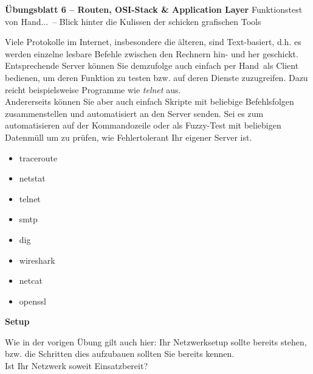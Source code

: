 \documentclass[paper=a4,fontsize=11pt]{scrartcl}%
\numberwithin{equation}{section}
\begin{document}
\begin{center}
\Large{\textbf{Übungsblatt 6 -- Routen, OSI-Stack \& Application Layer}}
\large{Funktionstest \glqq von Hand...\grqq\ -- Blick hinter die Kulissen der schicken grafischen Tools}
\end{center}
Viele Protokolle im Internet, insbesondere die älteren, sind Text-basiert, d.h. es werden einzelne lesbare Befehle zwischen den Rechnern hin- und her geschickt. Entsprechende Server können Sie demzufolge auch einfach \glqq per Hand\grqq\ als Client bedienen, um deren Funktion zu testen bzw. auf deren Dienste zuzugreifen. Dazu reicht beispielsweise Programme wie \emph{telnet} aus.\\
Andererseits können Sie  aber auch einfach Skripte mit beliebige Befehlsfolgen zusammenstellen und automatisiert an den Server senden. Sei es zum automatisieren auf der Kommandozeile oder als Fuzzy-Test mit beliebigen Datenmüll um zu prüfen, wie Fehlertolerant Ihr eigener Server ist.
\begin{multicols}{4}
\begin{itemize}
	\item traceroute
	\item netstat
	\item telnet
	\item smtp
	\item dig 
	\item wireshark
	\item netcat
	\item openssl
\end{itemize}
\end{multicols}
\begin{center}\Large{\textbf{Setup}}\end{center}\vskip0.25in
Wie in der vorigen Übung gilt auch hier: Ihr Netzwerksetup sollte bereits stehen, bzw. die Schritten dies aufzubauen sollten Sie bereits kennen.\\
Ist Ihr Netzwerk soweit Einsatzbereit?
\end{document}
